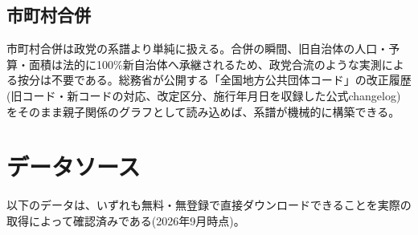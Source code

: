 \documentclass[a4paper,11pt]{ltjsarticle}
\begin{document}
\subsection{市町村合併}

市町村合併は政党の系譜より単純に扱える。合併の瞬間、旧自治体の人口・予算・面積は法的に100\%新自治体へ承継されるため、政党合流のような実測による按分は不要である。総務省が公開する「全国地方公共団体コード」の改正履歴(旧コード・新コードの対応、改定区分、施行年月日を収録した公式changelog)をそのまま親子関係のグラフとして読み込めば、系譜が機械的に構築できる。

\section{データソース}

以下のデータは、いずれも無料・無登録で直接ダウンロードできることを実際の取得によって確認済みである(2026年9月時点)。
\end{document}
